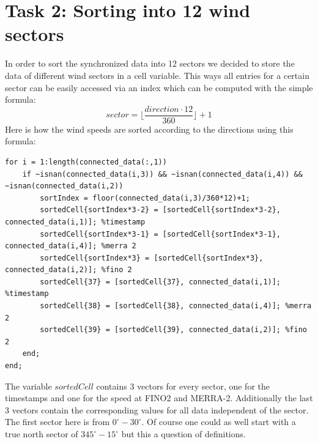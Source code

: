 \documentclass[10pt]{article}
\newcommand\floor[1]{\lfloor#1\rfloor}
\begin{document}
\section{Task 2: Sorting into 12 wind sectors}
In order to sort the synchronized data into 12 sectors we decided to store the data of different wind sectors in a cell variable. This ways all entries for a certain sector can be easily accessed via an index which can be computed with the simple formula:
\begin{equation*}
 sector = \floor{\frac{direction \cdot 12}{360}}+1 
\end{equation*}
Here is how the wind speeds are sorted according to the directions using this formula:
\begin{lstlisting}
for i = 1:length(connected_data(:,1))
    if ~isnan(connected_data(i,3)) && ~isnan(connected_data(i,4)) && ~isnan(connected_data(i,2))
        sortIndex = floor(connected_data(i,3)/360*12)+1;
        sortedCell{sortIndex*3-2} = [sortedCell{sortIndex*3-2}, connected_data(i,1)]; %timestamp
        sortedCell{sortIndex*3-1} = [sortedCell{sortIndex*3-1}, connected_data(i,4)]; %merra 2
        sortedCell{sortIndex*3} = [sortedCell{sortIndex*3}, connected_data(i,2)]; %fino 2
        sortedCell{37} = [sortedCell{37}, connected_data(i,1)]; %timestamp
        sortedCell{38} = [sortedCell{38}, connected_data(i,4)]; %merra 2
        sortedCell{39} = [sortedCell{39}, connected_data(i,2)]; %fino 2
    end;
end;
\end{lstlisting} 
The variable $sortedCell$ contains 3 vectors for every sector, one for the timestamps and one for the speed at FINO2 and MERRA-2. Additionally the last 3 vectors contain the corresponding values for all data independent of the sector.
The first sector here is from $0^{\circ}-30^{\circ}$. Of course one could as well start with a true north sector of $345^{\circ}-15^{\circ}$ but this a question of definitions.
\end{document}
